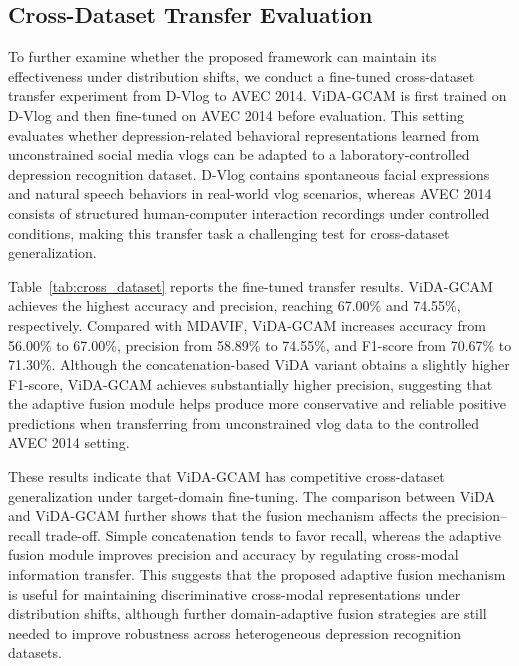 \documentclass[a4paper,fleqn]{cas-dc}
\begin{document}
\subsection{Cross-Dataset Transfer Evaluation}
To further examine whether the proposed framework can maintain its effectiveness under distribution shifts, we conduct a fine-tuned cross-dataset transfer experiment from D-Vlog to AVEC 2014. ViDA-GCAM is first trained on D-Vlog and then fine-tuned on AVEC 2014 before evaluation. This setting evaluates whether depression-related behavioral representations learned from unconstrained social media vlogs can be adapted to a laboratory-controlled depression recognition dataset. D-Vlog contains spontaneous facial expressions and natural speech behaviors in real-world vlog scenarios, whereas AVEC 2014 consists of structured human-computer interaction recordings under controlled conditions, making this transfer task a challenging test for cross-dataset generalization.


Table~\ref{tab:cross_dataset} reports the fine-tuned transfer results. ViDA-GCAM achieves the highest accuracy and precision, reaching 67.00\% and 74.55\%, respectively. Compared with MDAVIF, ViDA-GCAM increases accuracy from 56.00\% to 67.00\%, precision from 58.89\% to 74.55\%, and F1-score from 70.67\% to 71.30\%.
 Although the concatenation-based ViDA variant obtains a slightly higher F1-score, ViDA-GCAM achieves substantially higher precision, suggesting that the adaptive fusion module helps produce more conservative and reliable positive predictions when transferring from unconstrained vlog data to the controlled AVEC 2014 setting.

These results indicate that ViDA-GCAM has competitive cross-dataset generalization under target-domain fine-tuning. The comparison between ViDA and ViDA-GCAM further shows that the fusion mechanism affects the precision–recall trade-off. Simple concatenation tends to favor recall, whereas the adaptive fusion module improves precision and accuracy by regulating cross-modal information transfer. This suggests that the proposed adaptive fusion mechanism is useful for maintaining discriminative cross-modal representations under distribution shifts, although further domain-adaptive fusion strategies are still needed to improve robustness across heterogeneous depression recognition datasets.
\end{document}
